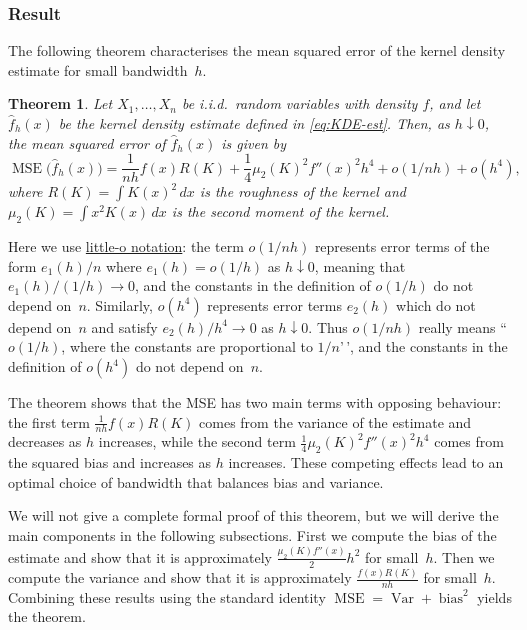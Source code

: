 \documentclass[
  a4paper,
]{article}
\newtheorem{theorem}{Theorem}[section]
\theoremstyle{definition}
\theoremstyle{definition}
\theoremstyle{definition}
\theoremstyle{definition}
\theoremstyle{remark}
\begin{document}
\subsubsection{Result}\label{result}

The following theorem characterises the mean squared error of the kernel
density estimate for small bandwidth~\(h\).

\begin{theorem}
\protect\hypertarget{thm:MSE-KDE}{}\label{thm:MSE-KDE}Let \(X_1, \ldots, X_n\) be i.i.d.~random variables with density \(f\), and
let \(\hat f_h(x)\) be the kernel density estimate defined in \eqref{eq:KDE-est}.
Then, as \(h \downarrow 0\), the mean squared error of \(\hat f_h(x)\) is given by
\begin{equation}
  \mathop{\mathrm{MSE}}\nolimits\bigl( \hat f_h(x) \bigr)
  = \frac{1}{nh} f(x) R(K) + \frac14 \mu_2(K)^2 f''(x)^2 h^4
      + o(1/nh) + o(h^4),  \label{eq:f-hat-MSE}
\end{equation}
where \(R(K) = \int K(x)^2 \,dx\) is the roughness of the kernel and
\(\mu_2(K) = \int x^2 K(x) \,dx\) is the second moment of the kernel.
\end{theorem}

Here we use
\href{https://en.wikipedia.org/wiki/Big_O_notation\#Little-o_notation}{little-o notation}:
the term \(o(1/nh)\) represents error terms of the form \(e_1(h)/n\) where
\(e_1(h) = o(1/h)\) as \(h \downarrow 0\), meaning that \(e_1(h) / (1/h) \to 0\),
and the constants in the definition of \(o(1/h)\) do not depend on~\(n\).
Similarly, \(o(h^4)\) represents error terms \(e_2(h)\) which do not depend
on~\(n\) and satisfy \(e_2(h) / h^4 \to 0\) as \(h \downarrow 0\). Thus \(o(1/nh)\)
really means ``\(o(1/h)\), where the constants are proportional to \(1/n\)'\,',
and the constants in the definition of \(o(h^4)\) do not depend on~\(n\).

The theorem shows that the MSE has two main terms with opposing behaviour:
the first term \(\frac{1}{nh} f(x) R(K)\) comes from the variance of the
estimate and decreases as \(h\) increases, while the second term
\(\frac14 \mu_2(K)^2 f''(x)^2 h^4\) comes from the squared bias and
increases as \(h\) increases. These competing effects lead to an optimal
choice of bandwidth that balances bias and variance.

We will not give a complete formal proof of this theorem, but we will
derive the main components in the following subsections. First we
compute the bias of the estimate and show that it is approximately
\(\frac{\mu_2(K) f''(x)}{2} h^2\) for small~\(h\). Then we compute the
variance and show that it is approximately \(\frac{f(x) R(K)}{nh}\) for
small~\(h\). Combining these results using the standard identity
\(\mathop{\mathrm{MSE}}\nolimits= \mathop{\mathrm{Var}}+ \mathop{\mathrm{bias}}^2\) yields the theorem.
\end{document}
